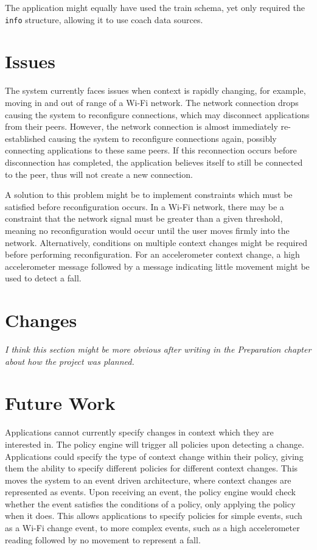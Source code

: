 \documentclass[12pt,twoside,notitlepage]{report}
\begin{document}
The application might equally have used the train schema, yet only required the {\tt info} structure, allowing it to use coach data sources.

\section{Issues}
The system currently faces issues when context is rapidly changing, for example, moving in and out of range of a Wi-Fi network. 
The network connection drops causing the system to reconfigure connections, which may disconnect applications from their peers.
However, the network connection is almost immediately re-established causing the system to reconfigure connections again, possibly connecting applications to these same peers. 
If this reconnection occurs before disconnection has completed, the application believes itself to still be connected to the peer, thus will not create a new connection.

A solution to this problem might be to implement constraints which must be satisfied before reconfiguration occurs. 
In a Wi-Fi network, there may be a constraint that the network signal must be greater than a given threshold, meaning no reconfiguration would occur until the user moves firmly into the network. 
Alternatively, conditions on multiple context changes might be required before performing reconfiguration.  
For an accelerometer context change, a high accelerometer message followed by a message indicating little movement might be used to detect a fall.

\section{Changes}
{\sl I think this section might be more obvious after writing in the Preparation chapter about how the project was planned. }


\section{Future Work}

Applications cannot currently specify changes in context which they are interested in. 
The policy engine will trigger all policies upon detecting a change.
Applications could specify the type of context change within their policy, giving them the ability to specify different policies for different context changes. 
This moves the system to an event driven architecture, where context changes are represented as events. 
Upon receiving an event, the policy engine would check whether the event satisfies the conditions of a policy, only applying the policy when it does. 
This allows applications to specify policies for simple events, such as a Wi-Fi change event, to more complex events, such as a high accelerometer reading followed by no movement to represent a fall. 
\end{document}
